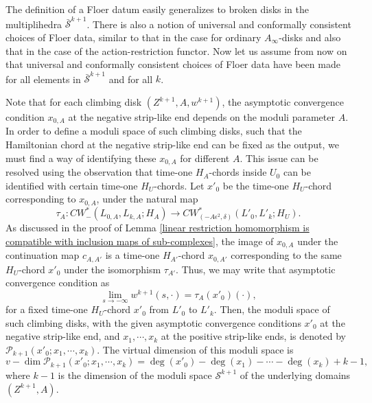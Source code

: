 \documentclass{amsart}
\numberwithin{equation}{section}
\numberwithin{figure}{section}
\begin{document}
	The definition of a Floer datum easily generalizes to broken disks in the multiplihedra $\bar{\mathcal{S}}^{k+1}$. There is also a notion of universal and conformally consistent choices of Floer data, similar to that in the case for ordinary $A_{\infty}$-disks and also that in the case of the action-restriction functor. Now let us assume from now on that universal and conformally consistent choices of Floer data have been made for all elements in $\bar{\mathcal{S}}^{k+1}$ and for all $k$. \par
	Note that for each climbing disk $(Z^{k+1}, A, w^{k+1})$, the asymptotic convergence condition $x_{0, A}$ at the negative strip-like end depends on the moduli parameter $A$. In order to define a moduli space of such climbing disks, such that the Hamiltonian chord at the negative strip-like end can be fixed as the output, we must find a way of identifying these $x_{0, A}$ for different $A$. This issue can be resolved using the observation that time-one $H_{A}$-chords inside $U_{0}$ can be identified with certain time-one $H_{U}$-chords. Let $x'_{0}$ be the time-one $H_{U}$-chord corresponding to $x_{0, A}$, under the natural map
\begin{equation*}
\tau_{A}: CW^{*}_{-}(L_{0, A}, L_{k, A}; H_{A}) \to CW^{*}_{(-A\epsilon^{2}, \delta)}(L'_{0}, L'_{k}; H_{U}).
\end{equation*}
As discussed in the proof of Lemma \ref{linear restriction homomorphism is compatible with inclusion maps of sub-complexes}, the image of $x_{0, A}$ under the continuation map $c_{A, A'}$ is a time-one $H_{A'}$-chord $x_{0, A'}$ corresponding to the same $H_{U}$-chord $x'_{0}$ under the  isomorphism $\tau_{A'}$. Thus, we may write that asymptotic convergence condition as
\begin{equation}
\lim\limits_{s \to -\infty} w^{k+1}(s, \cdot) = \tau_{A}(x'_{0})(\cdot),
\end{equation}
for a fixed time-one $H_{U}$-chord $x'_{0}$ from $L'_{0}$ to $L'_{k}$. Then, the moduli space of such climbing disks, with the given asymptotic convergence conditions $x'_{0}$ at the negative strip-like end, and $x_{1}, \cdots, x_{k}$ at the positive strip-like ends, is denoted by $\mathcal{P}_{k+1}(x'_{0}; x_{1}, \cdots, x_{k})$. The virtual dimension of this moduli space is
\begin{equation*}
v-\dim \mathcal{P}_{k+1}(x'_{0}; x_{1}, \cdots, x_{k}) = \deg(x'_{0}) - \deg(x_{1}) - \cdots - \deg(x_{k}) + k - 1,
\end{equation*}
where $k-1$ is the dimension of the moduli space $\mathcal{S}^{k+1}$ of the underlying domains $(Z^{k+1}, A)$. \par
\end{document}
